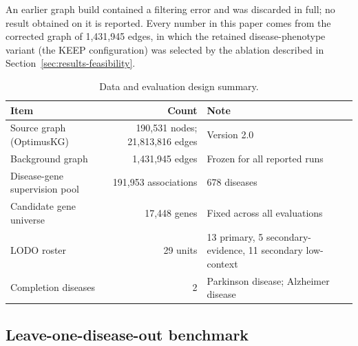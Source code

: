 \documentclass[11pt]{article}
\begin{document}
An earlier graph build contained a filtering error and was discarded in full; no result obtained on it is reported. Every number in this paper comes from the corrected graph of 1,431,945 edges, in which the retained disease-phenotype variant (the KEEP configuration) was selected by the ablation described in Section~\ref{sec:results-feasibility}.

\begin{table}[t]
\centering
\small
\caption{Data and evaluation design summary.}
\label{tab:data}
\begin{tabularx}{\textwidth}{@{}L r L@{}}
\toprule
\textbf{Item} & \textbf{Count} & \textbf{Note} \\
\midrule
Source graph (OptimusKG) & 190,531 nodes; 21,813,816 edges & Version 2.0 \\
Background graph & 1,431,945 edges & Frozen for all reported runs \\
Disease-gene supervision pool & 191,953 associations & 678 diseases \\
Candidate gene universe & 17,448 genes & Fixed across all evaluations \\
LODO roster & 29 units & 13 primary, 5 secondary-evidence, 11 secondary low-context \\
Completion diseases & 2 & Parkinson disease; Alzheimer disease \\
\bottomrule
\end{tabularx}
\end{table}

\subsection{Leave-one-disease-out benchmark}
\end{document}
